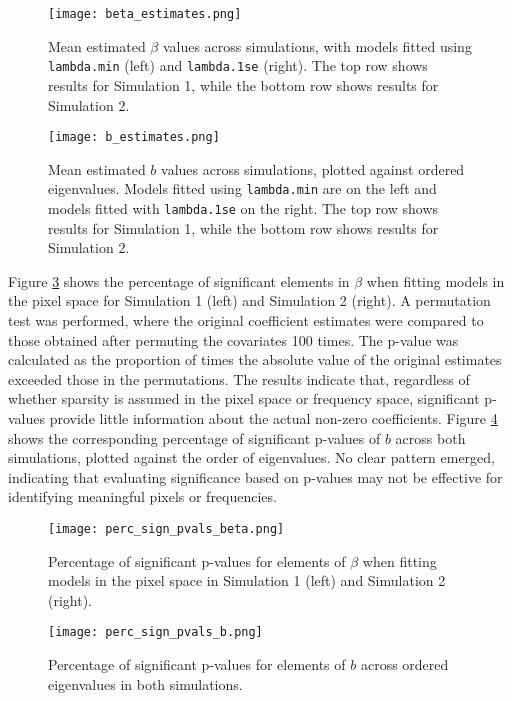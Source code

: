 \documentclass[12pt]{article}
\begin{document}
\begin{figure}[htbp] 
	\centering
  \texttt{[image: beta\_estimates.png]} 
  \caption{Mean estimated \( \beta \) values across simulations, with models fitted using \texttt{lambda.min} (left) and
  \texttt{lambda.1se} (right). The top row shows results for Simulation 1, while the bottom row shows results for Simulation 2.}
	\label{fig:beta_estimates} 
\end{figure}

\begin{figure}[htbp] 
	\centering
  \texttt{[image: b\_estimates.png]} 
  \caption{Mean estimated \( b \) values across simulations, plotted against ordered eigenvalues. Models fitted using
  \texttt{lambda.min} are on the left and models fitted with \texttt{lambda.1se} on the right. The top row shows results for Simulation 1, while the bottom row shows results for Simulation 2.}
  \label{fig:b_estimates} 
\end{figure}

Figure \ref{fig:perc_sign_beta} shows the percentage of significant elements in \( \beta \) when fitting models in the
pixel space for Simulation 1 (left) and Simulation 2 (right). A permutation test was performed, where the original
coefficient estimates were compared to those obtained after permuting the covariates 100 times. The p-value was
calculated as the proportion of times the absolute value of the original estimates exceeded those in the permutations.
The results indicate that, regardless of whether sparsity is assumed in the pixel space or frequency space, significant
p-values provide little information about the actual non-zero coefficients. Figure \ref{fig:perc_sign_b} shows the corresponding percentage of significant p-values of \( b \) across both
simulations, plotted against the order of eigenvalues. No clear pattern emerged, indicating that evaluating significance
based on p-values may not be effective for identifying meaningful pixels or frequencies.

\begin{figure}[htbp] 
	\centering
  \texttt{[image: perc\_sign\_pvals\_beta.png]} 
  \caption{Percentage of significant p-values for elements of \( \beta \) when fitting models in the pixel space in
  Simulation 1 (left) and Simulation 2 (right).}
	\label{fig:perc_sign_beta} 
\end{figure}

\begin{figure}[htbp] 
	\centering
  \texttt{[image: perc\_sign\_pvals\_b.png]} 
  \caption{Percentage of significant p-values for elements of \( b \) across ordered eigenvalues in both simulations.}
	\label{fig:perc_sign_b} 
\end{figure}
\end{document}
